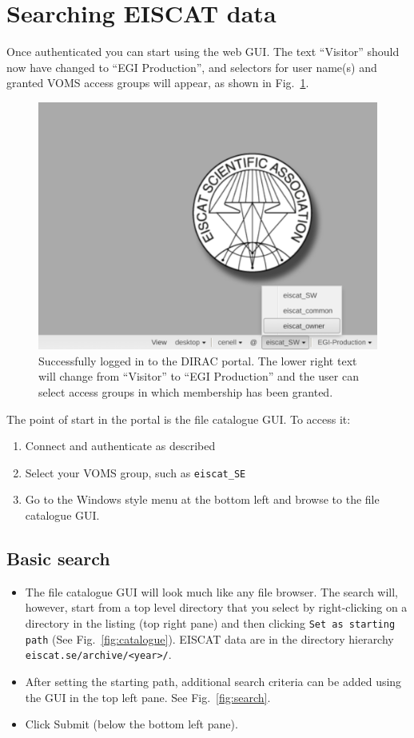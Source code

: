 \documentclass[a4paper]{article}
\begin{document}
\section{Searching EISCAT data}
\label{sec:searching}

Once authenticated you can start using the web GUI. The text ``Visitor'' should now have changed to ``EGI Production'', and selectors for user name(s) and granted VOMS access groups will appear, as shown in Fig.~\ref{fig:checkin-succeeded}.

\begin{figure}[htb]
  \centering
  \includegraphics[width=0.5\linewidth]{dirac-gui-checkin-ok}
  \caption{Successfully logged in to the DIRAC portal. The lower right text will change from ``Visitor'' to ``EGI Production'' and the user can select access groups in which membership has been granted.}
  \label{fig:checkin-succeeded}
\end{figure}

The point of start in the portal is the file catalogue GUI. To access it:

\begin{enumerate}
\item Connect and authenticate as described
\item Select your VOMS group, such as \texttt{eiscat\_SE}
\item Go to the Windows style menu at the bottom left and browse to the file catalogue GUI. 
\end{enumerate}

\subsection{Basic search}
\label{sec:searchdir}


\begin{itemize}
\item  The file catalogue GUI will look much like any file browser. The search will, however, start from a top level directory that you select by right-clicking on a directory in the listing (top right pane) and then clicking \texttt{Set as starting path} (See Fig.~\ref{fig:catalogue}). EISCAT data are in the directory hierarchy \texttt{eiscat.se/archive/<year>/}.
\item After setting the starting path, additional search criteria can be added using the GUI in the top left pane. See Fig.~\ref{fig:search}. 
\item Click Submit (below the bottom left pane). 
\end{itemize}
\end{document}

